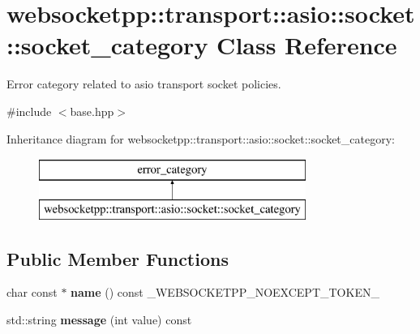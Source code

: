 \hypertarget{classwebsocketpp_1_1transport_1_1asio_1_1socket_1_1socket__category}{}\section{websocketpp\+:\+:transport\+:\+:asio\+:\+:socket\+:\+:socket\+\_\+category Class Reference}
\label{classwebsocketpp_1_1transport_1_1asio_1_1socket_1_1socket__category}


Error category related to asio transport socket policies.  




{\ttfamily \#include $<$base.\+hpp$>$}

Inheritance diagram for websocketpp\+:\+:transport\+:\+:asio\+:\+:socket\+:\+:socket\+\_\+category\+:\begin{figure}[H]
\begin{center}
\leavevmode
\includegraphics[height=2.000000cm]{classwebsocketpp_1_1transport_1_1asio_1_1socket_1_1socket__category}
\end{center}
\end{figure}
\subsection*{Public Member Functions}
\begin{DoxyCompactItemize}
\item 
char const  $\ast$ {\bfseries name} () const \+\_\+\+W\+E\+B\+S\+O\+C\+K\+E\+T\+P\+P\+\_\+\+N\+O\+E\+X\+C\+E\+P\+T\+\_\+\+T\+O\+K\+E\+N\+\_\+\hypertarget{classwebsocketpp_1_1transport_1_1asio_1_1socket_1_1socket__category_aae34251fd85287d7acc17a7ed6a5c79e}{}\label{classwebsocketpp_1_1transport_1_1asio_1_1socket_1_1socket__category_aae34251fd85287d7acc17a7ed6a5c79e}

\item 
std\+::string {\bfseries message} (int value) const\hypertarget{classwebsocketpp_1_1transport_1_1asio_1_1socket_1_1socket__category_ad1896d95678feb6dbbd43ecea14b19d9}{}\label{classwebsocketpp_1_1transport_1_1asio_1_1socket_1_1socket__category_ad1896d95678feb6dbbd43ecea14b19d9}

\end{DoxyCompactItemize}


